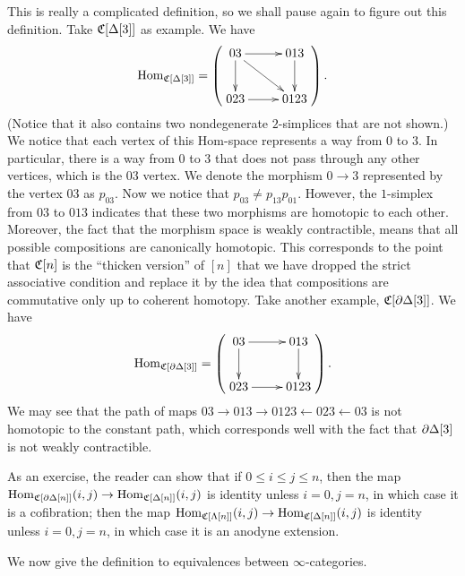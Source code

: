 This is really a complicated definition, so we shall pause again to figure out this definition. Take $\mathfrak{C}[\Delta[3]]$ as example. We have
$$\Hom_{\C[\Delta[3]]}=\9\vcenter{\xymatrix{03\ar[r]\ar[d]\ar[rd]&013\ar[d]\\023\ar[r]&0123}}\0.$$
(Notice that it also contains two nondegenerate $2$-simplices that are not shown.) We notice that each vertex of this 
Hom-space represents a way from $0$ to $3$. In particular, there is a way from $0$ to $3$ that does not pass through any other vertices,
which is the $03$ vertex. We denote the morphism $0\to 3$ represented by the vertex $03$ as $p_{03}$. Now we notice that
$p_{03}\ne p_{13}p_{01}$. However, the $1$-simplex from $03$ to $013$ indicates that these two morphisms are homotopic to each other.
Moreover, the fact that the morphism space is weakly contractible, means that all possible compositions are canonically homotopic.
This corresponds to the point that $\mathfrak{C}[n]$ is the ``thicken version'' of $[n]$ that we have dropped the strict associative condition
and replace it by the idea that compositions are commutative only up to coherent homotopy. Take another example, $\mathfrak{C}[\partial\Delta[3]]$.
We have $$\Hom_{\C[\p\d[3]]}=\9\vcenter{\xymatrix{03\ar[r]\ar[d]&013\ar[d]\\023\ar[r]&0123}}\0.$$ We may see that the path of maps
$03\to 013\to 0123\leftarrow 023\leftarrow 03$ is not homotopic to the constant path, which corresponds well with the fact that
$\partial\Delta[3]$ is not weakly contractible.

As an exercise, the reader can show that if $0\le i\le j\le n$, then the map $\operatorname{Hom}_{\mathfrak{C}[\partial\Delta[n]]}(i,j)\to\operatorname{Hom}_{\mathfrak{C}[\Delta[n]]}(i,j)$
is identity unless $i=0,j=n$, in which case it is a cofibration; then the map $\operatorname{Hom}_{\mathfrak{C}[\Lambda[n]]}(i,j)\to\operatorname{Hom}_{\mathfrak{C}[\Delta[n]]}(i,j)$
is identity unless $i=0,j=n$, in which case it is an anodyne extension.




We now give the definition to equivalences between $\infty$-categories.


